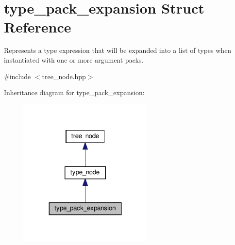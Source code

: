 \hypertarget{structtype__pack__expansion}{}\section{type\+\_\+pack\+\_\+expansion Struct Reference}
\label{structtype__pack__expansion}


Represents a type expression that will be expanded into a list of types when instantiated with one or more argument packs.  




{\ttfamily \#include $<$tree\+\_\+node.\+hpp$>$}



Inheritance diagram for type\+\_\+pack\+\_\+expansion\+:
\nopagebreak
\begin{figure}[H]
\begin{center}
\leavevmode
\includegraphics[width=191pt]{da/d52/structtype__pack__expansion__inherit__graph}
\end{center}
\end{figure}


